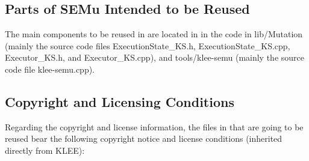 \subsection{Parts of SEMu Intended to be Reused}

The main components to be reused in \SEMUS are located in in the code in lib/Mutation (mainly the source code files ExecutionState\_KS.h, ExecutionState\_KS.cpp, Executor\_KS.h, and Executor\_KS.cpp), and tools/klee-semu (mainly the source code file klee-semu.cpp).

\subsection{Copyright and Licensing Conditions}

Regarding the copyright and license information, the files in \SEMU that are going to be reused bear the following copyright notice and license conditions (inherited directly from KLEE):

